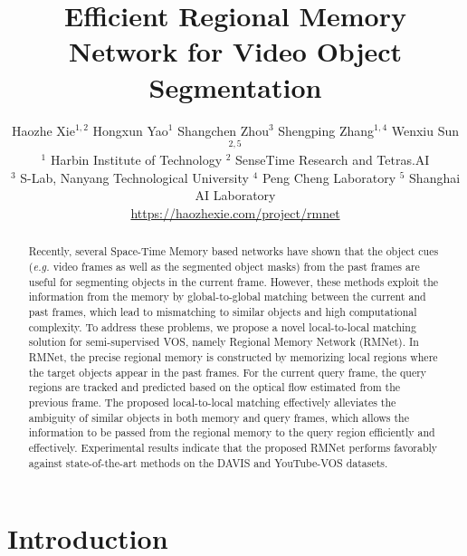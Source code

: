 \documentclass[final]{cvpr}
\begin{document}
\title{Efficient Regional Memory Network for Video Object Segmentation}

\author{
Haozhe Xie$^{1,2}$\hspace{4 mm}
Hongxun Yao$^1$ \hspace{4 mm}
Shangchen Zhou$^3$ \hspace{4 mm}
Shengping Zhang$^{1,4}$ \hspace{4 mm}
Wenxiu Sun$^{2,5}$\\
$^1$ Harbin Institute of Technology\hspace{4 mm}
$^2$ SenseTime Research and Tetras.AI\\
$^3$ S-Lab, Nanyang Technological University\hspace{4 mm}
$^4$ Peng Cheng Laboratory\hspace{4 mm}
$^5$ Shanghai AI Laboratory\\
\url{https://haozhexie.com/project/rmnet}
}

\maketitle


\begin{abstract}
Recently, several Space-Time Memory based networks have shown that the object cues ({\it e.g.} video frames as well as the segmented object masks) from the past frames are useful for segmenting objects in the current frame.
However, these methods exploit the information from the memory by global-to-global matching between the current and past frames, which lead to mismatching to similar objects and high computational complexity.
To address these problems, we propose a novel local-to-local matching solution for semi-supervised VOS, namely Regional Memory Network (RMNet).
In RMNet, the precise regional memory is constructed by memorizing local regions where the target objects appear in the past frames.
For the current query frame, the query regions are tracked and predicted based on the optical flow estimated from the previous frame.
The proposed local-to-local matching effectively alleviates the ambiguity of similar objects in both memory and query frames, which allows the information to be passed from the regional memory to the query region efficiently and effectively.
Experimental results indicate that the proposed RMNet performs favorably against state-of-the-art methods on the DAVIS and YouTube-VOS datasets.
\end{abstract}

\section{Introduction}
\end{document}
